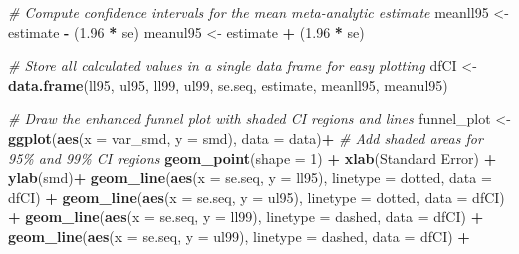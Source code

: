 \documentclass[
]{book}
\newenvironment{Shaded}{\begin{snugshade}}{\end{snugshade}}
\newcommand{\AttributeTok}[1]{\textcolor[rgb]{0.13,0.29,0.53}{#1}}
\newcommand{\CommentTok}[1]{\textcolor[rgb]{0.56,0.35,0.01}{\textit{#1}}}
\newcommand{\DecValTok}[1]{\textcolor[rgb]{0.00,0.00,0.81}{#1}}
\newcommand{\FloatTok}[1]{\textcolor[rgb]{0.00,0.00,0.81}{#1}}
\newcommand{\FunctionTok}[1]{\textcolor[rgb]{0.13,0.29,0.53}{\textbf{#1}}}
\newcommand{\NormalTok}[1]{#1}
\newcommand{\OtherTok}[1]{\textcolor[rgb]{0.56,0.35,0.01}{#1}}
\newcommand{\SpecialCharTok}[1]{\textcolor[rgb]{0.81,0.36,0.00}{\textbf{#1}}}
\newcommand{\StringTok}[1]{\textcolor[rgb]{0.31,0.60,0.02}{#1}}
\begin{document}
\begin{Shaded}
\begin{Highlighting}[]
\CommentTok{\# Compute confidence intervals for the mean meta{-}analytic estimate}
\NormalTok{meanll95 }\OtherTok{\textless{}{-}}\NormalTok{ estimate }\SpecialCharTok{{-}}\NormalTok{ (}\FloatTok{1.96} \SpecialCharTok{*}\NormalTok{ se)}
\NormalTok{meanul95 }\OtherTok{\textless{}{-}}\NormalTok{ estimate }\SpecialCharTok{+}\NormalTok{ (}\FloatTok{1.96} \SpecialCharTok{*}\NormalTok{ se)}

\CommentTok{\# Store all calculated values in a single data frame for easy plotting}
\NormalTok{dfCI }\OtherTok{\textless{}{-}} \FunctionTok{data.frame}\NormalTok{(ll95, ul95, ll99, ul99, se.seq, estimate, meanll95, meanul95)}


\CommentTok{\# Draw the enhanced funnel plot with shaded CI regions and lines}
\NormalTok{funnel\_plot }\OtherTok{\textless{}{-}} \FunctionTok{ggplot}\NormalTok{(}\FunctionTok{aes}\NormalTok{(}\AttributeTok{x =}\NormalTok{ var\_smd, }\AttributeTok{y =}\NormalTok{ smd), }\AttributeTok{data =}\NormalTok{ data)}\SpecialCharTok{+}
  \CommentTok{\# Add shaded areas for 95\% and 99\% CI regions}
  \FunctionTok{geom\_point}\NormalTok{(}\AttributeTok{shape =} \DecValTok{1}\NormalTok{) }\SpecialCharTok{+}
  \FunctionTok{xlab}\NormalTok{(}\StringTok{\textquotesingle{}Standard Error\textquotesingle{}}\NormalTok{) }\SpecialCharTok{+} \FunctionTok{ylab}\NormalTok{(}\StringTok{\textquotesingle{}smd\textquotesingle{}}\NormalTok{)}\SpecialCharTok{+}
  \FunctionTok{geom\_line}\NormalTok{(}\FunctionTok{aes}\NormalTok{(}\AttributeTok{x =}\NormalTok{ se.seq, }\AttributeTok{y =}\NormalTok{ ll95), }\AttributeTok{linetype =} \StringTok{\textquotesingle{}dotted\textquotesingle{}}\NormalTok{, }\AttributeTok{data =}\NormalTok{ dfCI) }\SpecialCharTok{+}
  \FunctionTok{geom\_line}\NormalTok{(}\FunctionTok{aes}\NormalTok{(}\AttributeTok{x =}\NormalTok{ se.seq, }\AttributeTok{y =}\NormalTok{ ul95), }\AttributeTok{linetype =} \StringTok{\textquotesingle{}dotted\textquotesingle{}}\NormalTok{, }\AttributeTok{data =}\NormalTok{ dfCI) }\SpecialCharTok{+}
  \FunctionTok{geom\_line}\NormalTok{(}\FunctionTok{aes}\NormalTok{(}\AttributeTok{x =}\NormalTok{ se.seq, }\AttributeTok{y =}\NormalTok{ ll99), }\AttributeTok{linetype =} \StringTok{\textquotesingle{}dashed\textquotesingle{}}\NormalTok{, }\AttributeTok{data =}\NormalTok{ dfCI) }\SpecialCharTok{+}
  \FunctionTok{geom\_line}\NormalTok{(}\FunctionTok{aes}\NormalTok{(}\AttributeTok{x =}\NormalTok{ se.seq, }\AttributeTok{y =}\NormalTok{ ul99), }\AttributeTok{linetype =} \StringTok{\textquotesingle{}dashed\textquotesingle{}}\NormalTok{, }\AttributeTok{data =}\NormalTok{ dfCI) }\SpecialCharTok{+}

\end{Highlighting}
\end{Shaded}
\end{document}
